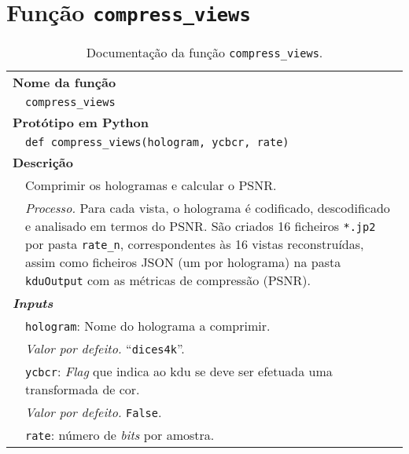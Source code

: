 
\newpage
\section{Função \texttt{compress\_views}}
\label{sec::doc-codigo:compress_views}

\begin{table}[!hp]
    \centering
    \caption{Documentação da função \texttt{compress\_views}.}
    \label{tab:compress_views}
    \begin{tabular}{p{1cm} p{11.5cm}}
        \hline
        \multicolumn{2}{l}{\bfseries\small Nome da função}\\
         & \verb|compress_views|\\
        \hline
        \multicolumn{2}{l}{\bfseries\small Protótipo em Python}\\
         & \texttt{def compress_views(hologram, ycbcr, rate)} \\
        \hline\multicolumn{2}{l}{\bfseries\small Descrição}\\
         & Comprimir os hologramas e calcular o \ac{PSNR}. \\
         & \textit{Processo.} Para cada vista, o holograma é codificado, descodificado e analisado em termos do \ac{PSNR}. São criados 16 ficheiros \verb|*.jp2| por pasta \verb|rate_n|, correspondentes às 16 vistas reconstruídas, assim como ficheiros \ac{JSON} (um por holograma) na pasta \verb|kduOutput| com as métricas de compressão (\ac{PSNR}). \\
        \hline\multicolumn{2}{l}{\bfseries\small \textit{Inputs}}\\
         & \verb|hologram|: Nome do holograma a comprimir.\\
         & \hspace{1cm} \textit{Valor por defeito.} ``\verb|dices4k|''.\\
         & \verb|ycbcr|: \textit{Flag} que indica ao \ac{kdu} se deve ser efetuada uma transformada de cor.\\
         & \hspace{1cm} \textit{Valor por defeito.} \verb|False|.\\
         & \verb|rate|: número de \textit{bits} por amostra.\\

\end{tabular}
\end{table}
